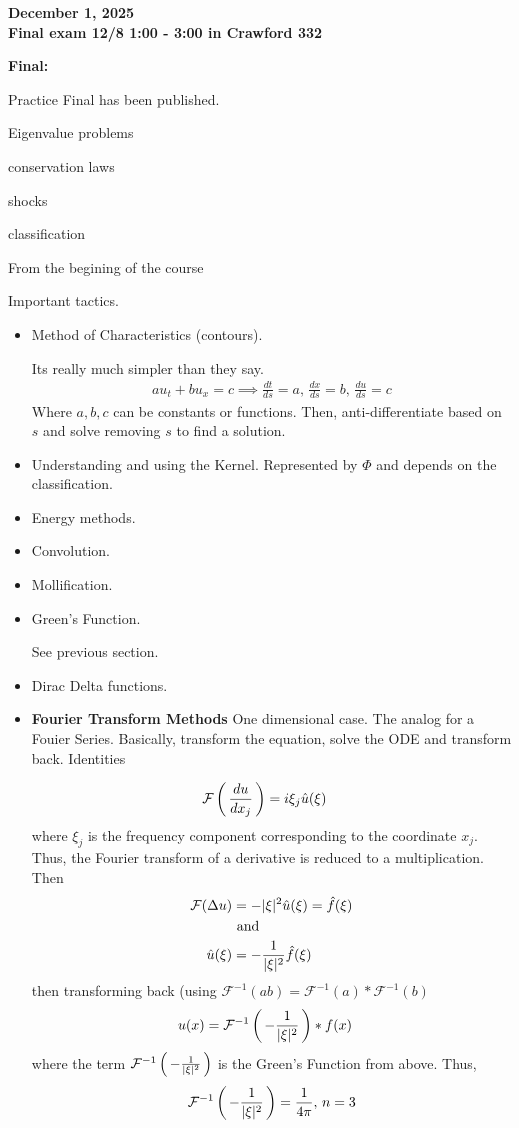 \documentclass[12pt,a4paper]{report}
\begin{document}
{\newpage
\textbf{\Large{December 1, 2025} \\Final exam 12/8 1:00 - 3:00 in Crawford 332}

\begin{description}
	\item \textbf{Final:} 
	
	Practice Final has been published.	
	
	Eigenvalue problems
	
	conservation laws
	
	shocks
	
	classification
	
	\item From the begining of the course

	Important tactics.
	\begin{itemize}
		\item Method of Characteristics (contours).
		
		Its really much simpler than they say.  
		\begin{align*}
			au_t+bu_x=c \implies \frac{dt}{ds}=a, \, \frac{dx}{ds}=b, \, \frac{du}{ds}=c
		\end{align*}Where $a,b,c$ can be constants or functions.  Then, anti-differentiate based on $s$ and solve removing $s$ to find a solution.
		
		\item Understanding and using the Kernel. Represented by $\Phi$ and depends on the classification.
		\item Energy methods.
		\item Convolution.
		\item Mollification.
		\item Green's Function.
		
		See previous section.
		
		\item Dirac Delta functions.
		\item \textbf{Fourier Transform Methods}  One dimensional case.  The analog for a Fouier Series.  Basically, transform the equation, solve the ODE and transform back.  Identities
	
	\begin{align*}
		\mathcal{F}\left (\, \frac{du}{dx_j} \,\right ) &= i\xi_j\hat{u}(\xi)
	\end{align*}where $\xi_j$ is the frequency component corresponding to the coordinate $x_j$.  Thus, the Fourier transform of a derivative is reduced to a multiplication.  Then
	\begin{align*}
		\mathcal{F}(\Delta u) &= -|\xi|^2\hat{u}(\xi)  =  \hat{f}(\xi)\\
		&\text{ and } \\
		\hat{u}(\xi) &= -\frac{1}{|\xi|^2}\hat{f}(\xi)
	\end{align*} then transforming back (using $\mathcal{F}^{-1}(ab)=\mathcal{F}^{-1}(a)*\mathcal{F}^{-1}(b)$
	\begin{align*}
		u(x) &= \mathcal{F}^{-1}\left (\, -\frac{1}{|\xi|^2} \,\right )* f(x)
	\end{align*}where the term $\mathcal{F}^{-1}\left (\, -\frac{1}{|\xi|^2} \,\right )$ is the Green's Function from above.  Thus,  $$\mathcal{F}^{-1}\left (\, -\frac{1}{|\xi|^2} \,\right )=\frac{1}{4\pi},\, n=3$$
	

\end{itemize}
\end{description}}
\end{document}
